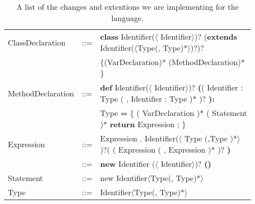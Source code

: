 \begin{table}[h]
  \caption{A list of the changes and extentions we are implementing for the language.}
  \begin{tabular}{ l  c  l}
    \hline
    ClassDeclaration & ::= & \textbf{class} Identifier($\langle$ Identifier$\rangle$)?
    (\textbf{extends} Identifier($\langle$Type(, Type)*$\rangle$)?)?  \\
    && \{(VarDeclaration)* (MethodDeclaration)* \}  \\
    \hline
    MethodDeclaration & ::= & \textbf{def} Identifier($\langle$ Identifier$\rangle$)?
    \textbf{(}( Identifier : Type ( , Identifier : Type )* )? \textbf{):}\\
    &&Type \textbf{=}
    \{ ( VarDeclaration )* ( Statement )*
    \textbf{return} Expression ; \}\\
    \hline
    Expression & ::= &  Expression . Identifier($\langle$ Type (,Type )*$\rangle$ )?( ( Expression ( , Expression )* )? \textbf{)} \\
    & ::= & \textbf{new} Identifier ($\langle$ Identifier$\rangle$)? \textbf{()} \\
    \hline
    Statement & ::= & new Identifier$\langle$Type(, Type)*$\rangle$ \\
    \hline
    Type & ::= & Identifier$\langle$Type(, Type)*$\rangle$ \\
    \hline
  \end{tabular}
\end{table}
